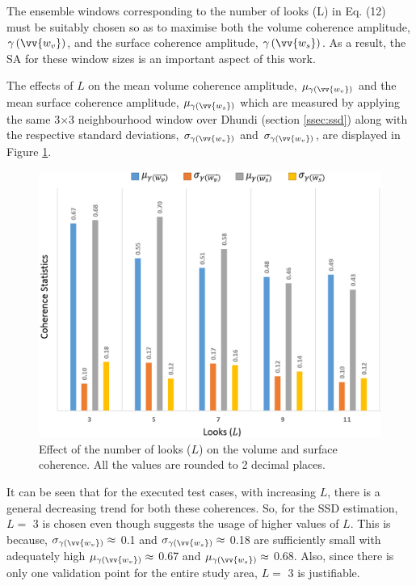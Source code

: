 \documentclass[review]{elsarticle}
\numberwithin{equation}{section}
\numberwithin{figure}{section}
\numberwithin{table}{section}
\begin{document}
The ensemble windows corresponding to the number of looks (L) in Eq. (12) must be suitably chosen so as to maximise both the volume coherence amplitude, $\gamma\left(\vv{w_v}\right)$, and the surface coherence amplitude, $\gamma\left(\vv{w_s}\right)$. As a result, the SA for these window sizes is an important aspect of this work.

The effects of $L$ on the mean volume coherence amplitude, $\mu_{\gamma\left(\vv{w_v}\right)}$ and the mean surface coherence
amplitude, $\mu_{\gamma\left(\vv{w_s}\right)}$ which are measured by applying the same 3$\times$3 neighbourhood window over Dhundi (section \ref{ssec:ssd}) along with the respective standard deviations, $\sigma_{\gamma\left(\vv{w_v}\right)}$ and $\sigma_{\gamma\left(\vv{w_v}\right)}$, are displayed in Figure \ref{fig:ssd_coh}. 

\begin{figure}[htb]
    \centering
    \includegraphics[width=\textwidth]{Figures/Results/Coh_SSD.png}
    \caption{Effect of the number of looks ($L$) on the volume and surface coherence. All the values are rounded to 2
decimal places.}
    \label{fig:ssd_coh}
\end{figure}

It can be seen that for the executed test cases, with increasing $L$, there is a general decreasing trend for both these coherences. So, for the SSD estimation, $L =$ 3 is chosen even though \cite{Cloude2005} suggests the usage of higher values of $L$. This is because, $\sigma_{\gamma\left(\vv{w_v}\right)} \approx$ 0.1 and $\sigma_{\gamma\left(\vv{w_s}\right)} \approx$ 0.18 are sufficiently small with adequately high $\mu_{\gamma\left(\vv{w_v}\right)} \approx$ 0.67 and $\mu_{\gamma\left(\vv{w_s}\right)} \approx$ 0.68. Also, since there is only one validation point for the entire study area, $L =$ 3 is justifiable.
\end{document}
